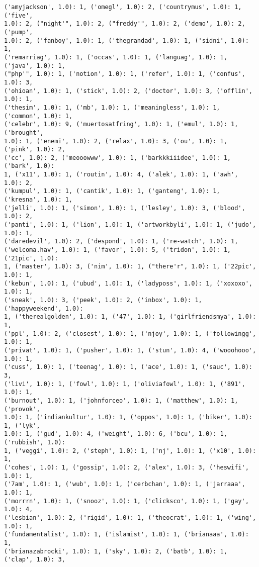 \documentclass[11pt]{article}
\begin{document}
\begin{Verbatim}[commandchars=\\\{\}]
('amyjackson', 1.0): 1, ('omegl', 1.0): 2, ('countrymus', 1.0): 1, ('five',
1.0): 2, ("night'", 1.0): 2, ("freddy'", 1.0): 2, ('demo', 1.0): 2, ('pump',
1.0): 2, ('fanboy', 1.0): 1, ('thegrandad', 1.0): 1, ('sidni', 1.0): 1,
('remarriag', 1.0): 1, ('occas', 1.0): 1, ('languag', 1.0): 1, ('java', 1.0): 1,
("php'", 1.0): 1, ('notion', 1.0): 1, ('refer', 1.0): 1, ('confus', 1.0): 3,
('ohioan', 1.0): 1, ('stick', 1.0): 2, ('doctor', 1.0): 3, ('offlin', 1.0): 1,
('thesim', 1.0): 1, ('mb', 1.0): 1, ('meaningless', 1.0): 1, ('common', 1.0): 1,
('celebr', 1.0): 9, ('muertosatfring', 1.0): 1, ('emul', 1.0): 1, ('brought',
1.0): 1, ('enemi', 1.0): 2, ('relax', 1.0): 3, ('ou', 1.0): 1, ('pink', 1.0): 2,
('cc', 1.0): 2, ('meooowww', 1.0): 1, ('barkkkiiidee', 1.0): 1, ('bark', 1.0):
1, ('x11', 1.0): 1, ('routin', 1.0): 4, ('alek', 1.0): 1, ('awh', 1.0): 2,
('kumpul', 1.0): 1, ('cantik', 1.0): 1, ('ganteng', 1.0): 1, ('kresna', 1.0): 1,
('jelli', 1.0): 1, ('simon', 1.0): 1, ('lesley', 1.0): 3, ('blood', 1.0): 2,
('panti', 1.0): 1, ('lion', 1.0): 1, ('artworkbyli', 1.0): 1, ('judo', 1.0): 1,
('daredevil', 1.0): 2, ('despond', 1.0): 1, ('re-watch', 1.0): 1,
('welcoma.hav', 1.0): 1, ('favor', 1.0): 5, ('tridon', 1.0): 1, ('21pic', 1.0):
1, ('master', 1.0): 3, ('nim', 1.0): 1, ("there'r", 1.0): 1, ('22pic', 1.0): 1,
('kebun', 1.0): 1, ('ubud', 1.0): 1, ('ladyposs', 1.0): 1, ('xoxoxo', 1.0): 1,
('sneak', 1.0): 3, ('peek', 1.0): 2, ('inbox', 1.0): 1, ('happyweekend', 1.0):
1, ('therealgolden', 1.0): 1, ('47', 1.0): 1, ('girlfriendsmya', 1.0): 1,
('ppl', 1.0): 2, ('closest', 1.0): 1, ('njoy', 1.0): 1, ('followingg', 1.0): 1,
('privat', 1.0): 1, ('pusher', 1.0): 1, ('stun', 1.0): 4, ('wooohooo', 1.0): 1,
('cuss', 1.0): 1, ('teenag', 1.0): 1, ('ace', 1.0): 1, ('sauc', 1.0): 3,
('livi', 1.0): 1, ('fowl', 1.0): 1, ('oliviafowl', 1.0): 1, ('891', 1.0): 1,
('burnout', 1.0): 1, ('johnforceo', 1.0): 1, ('matthew', 1.0): 1, ('provok',
1.0): 1, ('indiankultur', 1.0): 1, ('oppos', 1.0): 1, ('biker', 1.0): 1, ('lyk',
1.0): 1, ('gud', 1.0): 4, ('weight', 1.0): 6, ('bcu', 1.0): 1, ('rubbish', 1.0):
1, ('veggi', 1.0): 2, ('steph', 1.0): 1, ('nj', 1.0): 1, ('x10', 1.0): 1,
('cohes', 1.0): 1, ('gossip', 1.0): 2, ('alex', 1.0): 3, ('heswifi', 1.0): 1,
('7am', 1.0): 1, ('wub', 1.0): 1, ('cerbchan', 1.0): 1, ('jarraaa', 1.0): 1,
('morrrn', 1.0): 1, ('snooz', 1.0): 1, ('clicksco', 1.0): 1, ('gay', 1.0): 4,
('lesbian', 1.0): 2, ('rigid', 1.0): 1, ('theocrat', 1.0): 1, ('wing', 1.0): 1,
('fundamentalist', 1.0): 1, ('islamist', 1.0): 1, ('brianaaa', 1.0): 1,
('brianazabrocki', 1.0): 1, ('sky', 1.0): 2, ('batb', 1.0): 1, ('clap', 1.0): 3,

\end{Verbatim}
\end{document}
